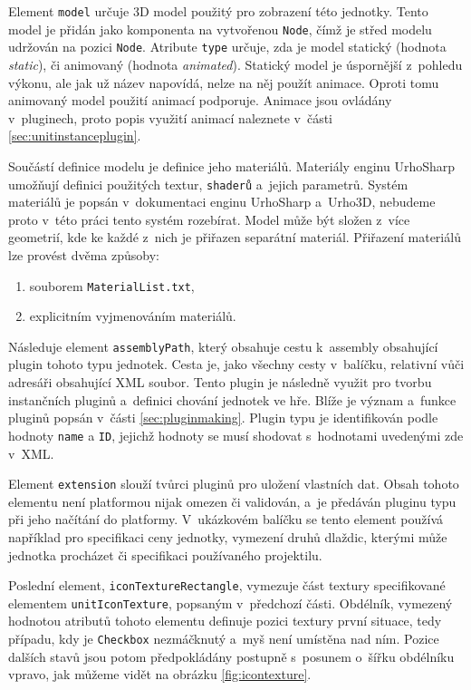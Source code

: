 Element \texttt{model} určuje 3D model použitý pro zobrazení této jednotky. Tento model je přidán jako komponenta na vytvořenou \texttt{Node}, čímž je střed modelu udržován na pozici \texttt{Node}. Atribute \texttt{type} určuje, zda je model statický (hodnota \textit{static}), či animovaný (hodnota \textit{animated}). Statický model je úspornější z~pohledu výkonu, ale jak už název napovídá, nelze na něj použít animace. Oproti tomu animovaný model použití animací podporuje. Animace jsou ovládány v~pluginech, proto popis využití animací naleznete v~části \ref{sec:unitinstanceplugin}.

Součástí definice modelu je definice jeho materiálů. Materiály enginu UrhoSharp umožňují definici použitých textur, \texttt{shaderů} a~jejich parametrů. Systém materiálů je popsán v~dokumentaci enginu UrhoSharp a~Urho3D, nebudeme proto v~této práci tento systém rozebírat. Model může být složen z~více geometrií, kde ke každé z~nich je přiřazen separátní materiál. Přiřazení materiálů lze provést dvěma způsoby:

\begin{enumerate}
	\item souborem \texttt{MaterialList.txt},
	\item explicitním vyjmenováním materiálů.
\end{enumerate}

Následuje element \texttt{assemblyPath}, který obsahuje cestu k~assembly obsahující plugin tohoto typu jednotek. Cesta je, jako všechny cesty v~balíčku, relativní vůči adresáři obsahující XML soubor. Tento plugin je následně využit pro tvorbu instančních pluginů a~definici chování jednotek ve hře. Blíže je význam a~funkce pluginů popsán v~části \ref{sec:pluginmaking}. Plugin typu je identifikován podle hodnoty \texttt{name} a \texttt{ID}, jejichž hodnoty se musí shodovat s~hodnotami uvedenými zde v~XML. 

Element \texttt{extension} slouží tvůrci pluginů pro uložení vlastních dat. Obsah tohoto elementu není platformou nijak omezen či validován, a~je předáván pluginu typu při jeho načítání do platformy. V~ukázkovém balíčku se tento element používá například pro specifikaci ceny jednotky, vymezení druhů dlaždic, kterými může jednotka procházet či specifikaci používaného projektilu.

Poslední element, \texttt{iconTextureRectangle}, vymezuje část textury specifikované elementem \texttt{unitIconTexture}, popsaným v~předchozí části. Obdélník, vymezený hodnotou atributů tohoto elementu definuje pozici textury první situace, tedy případu, kdy je \texttt{Checkbox} nezmáčknutý a~myš není umístěna nad ním. Pozice dalších stavů jsou potom předpokládány postupně s~posunem o~šířku obdélníku vpravo, jak můžeme vidět na obrázku \ref{fig:icontexture}.


